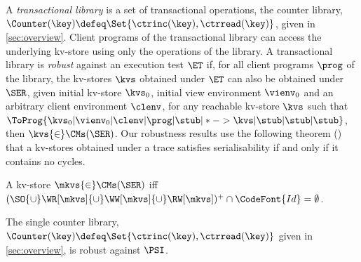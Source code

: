 A {\em transactional library}  is a set of transactional operations, \eg the counter
library, 
$\Counter(\key) \defeq \Set{\ctrinc(\key), \ctrread(\key)}$, given  in \cref{sec:overview}.  Client
programs of the transactional library can access the underlying kv-store using only
the operations of the library.
A transactional library  is \emph{robust} against an execution test $\ET$
if, for all client programs \( \prog \) of the library, 
the kv-stores \( \kvs \) obtained under $\ET$ can also be obtained
under $\SER$, 
\ie
given initial kv-store \( \kvs_0 \), initial view environment \( \vienv_0 \) and an arbitrary client environment \( \clenv \),
for any reachable kv-store \( \kvs \) such that
\( \ToProg{\kvs_0 | \vienv_0 | \clenv | \prog | \stub | * -> \kvs |
  \stub | \stub | \stub }\),
then \( \kvs {\in} \CMs(\SER) \). Our robustness results use the
following theorem () that a kv-stores
obtained under a trace satisfies serialisability if and only if  it contains no cycles. %

\begin{theorem}
\label{thm:serialisable_nocycle}
A kv-store $\mkvs {\in} \CMs(\SER)$ iff $(\SO {\cup} \WR[\mkvs] 
{\cup} \WW[\mkvs] {\cup} \RW[\mkvs])^{+} \cap \CodeFont{Id} = \emptyset$.
\end{theorem}
\SpaceBelowDef

\SpaceAboveDef
\begin{theorem}
\label{thm:singlecounterrobustness}
The single counter library, $\Counter(\key) \defeq \Set{\ctrinc(\key),
  \ctrread(\key)}$ given in \cref{sec:overview},  is robust against
\(\PSI\). 
\end{theorem}
\SpaceBelowDef


